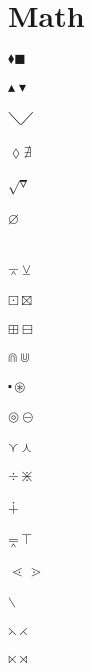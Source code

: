 \documentclass{article}
\begin{document}
\section{Math}
$\blacklozenge \blacksquare $\\\\
$\blacktriangle \blacktriangledown $\\\\
$\diagdown \diagup $\\\\
$\lozenge \nexists $\\\\
$\surd \triangledown$\\\\
$\varnothing $\\\\	
\\
$\barwedge \veebar $\\\\
$\boxdot \boxtimes $\\\\
$\boxplus \boxminus $\\\\
$\Cap \Cup $\\\\
$\centerdot \circledast $\\\\
$\circledcirc \circleddash $\\\\
$\curlyvee \curlywedge $\\\\
$\div \divideontimes $\\\\
$\dotplus$\\\\
$\doublebarwedge \intercal$\\\\
$\lessdot \gtrdot $\\\\
$\smallsetminus$\\\\
$\leftthreetimes \rightthreetimes $\\\\
$\ltimes \rtimes $\\\\
\end{document}
